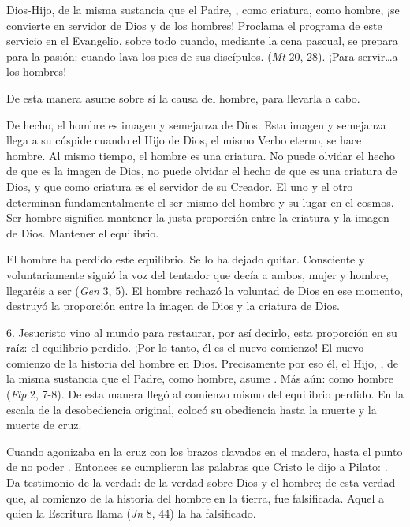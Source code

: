 \begin{body}
Dios-Hijo, de la misma sustancia que el Padre, , como criatura, como hombre, ¡se convierte en servidor de Dios y de los hombres! Proclama el programa de este servicio en el Evangelio, sobre todo cuando, mediante la cena pascual, se prepara para la pasión: cuando lava los pies de sus discípulos.  (\textit{Mt} 20, 28). ¡Para servir\ldots a los hombres!

De esta manera asume sobre sí la causa del hombre, para llevarla a cabo.

De hecho, el hombre es imagen y semejanza de Dios. Esta imagen y semejanza llega a su cúspide cuando el Hijo de Dios, el mismo Verbo eterno, se hace hombre. Al mismo tiempo, el hombre es una criatura. No puede olvidar el hecho de que es la imagen de Dios, no puede olvidar el hecho de que es una criatura de Dios, y que como criatura es el servidor de su Creador. El uno y el otro determinan fundamentalmente el ser mismo del hombre y su lugar en el cosmos. Ser hombre significa mantener la justa proporción entre la criatura y la imagen de Dios. Mantener el equilibrio.

El hombre ha perdido este equilibrio. Se lo ha dejado quitar. Consciente y voluntariamente siguió la voz del tentador que decía a ambos, mujer y hombre, llegaréis a ser  (\textit{Gen} 3, 5). El hombre rechazó la voluntad de Dios en ese momento, destruyó la proporción entre la imagen de Dios y la criatura de Dios.

6. Jesucristo vino al mundo para restaurar, por así decirlo, esta proporción en su raíz: el equilibrio perdido. ¡Por lo tanto, él es el nuevo comienzo! El nuevo comienzo de la historia del hombre en Dios. Precisamente por eso él, el Hijo, , de la misma sustancia que el Padre, como hombre, asume . Más aún: como hombre  (\textit{Flp} 2, 7-8). De esta manera llegó al comienzo mismo del equilibrio perdido. En la escala de la desobediencia original, colocó su obediencia hasta la muerte y la muerte de cruz.

Cuando agonizaba en la cruz con los brazos clavados en el madero, hasta el punto de no poder . Entonces se cumplieron las palabras que Cristo le dijo a Pilato: . Da testimonio de la verdad: de la verdad sobre Dios y el hombre; de esta verdad que, al comienzo de la historia del hombre en la tierra, fue falsificada. Aquel a quien la Escritura llama  (\textit{Jn} 8, 44) la ha falsificado.


\end{body}
